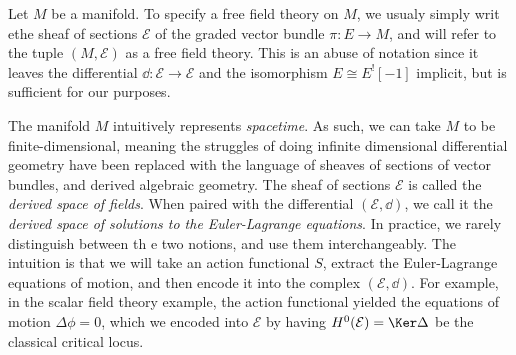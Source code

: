 \begin{terminology}\label{term:4.3.2}
	Let $M$ be a manifold. To specify a free field theory on $M$, we usualy simply writ ethe sheaf of sections $\mathcal{E} $ of the graded vector bundle $\pi : E \to M$, and will refer to the tuple $(M,\mathcal{E} )$ as a free field theory. This is an abuse of notation since it leaves the differential $\dd : \mathcal{E}  \to \mathcal{E} $ and the isomorphism $E\cong E^![-1]$ implicit, but is sufficient for our purposes.

	The manifold $M$ intuitively represents \emph{spacetime}. As such, we can take $M$ to be finite-dimensional, meaning the struggles of doing infinite dimensional differential geometry have been replaced with the language of sheaves of sections of vector bundles, and derived algebraic geometry. The sheaf of sections $\mathcal{E} $ is called the \emph{derived space of fields}. When paired with the differential $(\mathcal{E} ,\dd )$, we call it the \emph{derived space of solutions to the Euler-Lagrange equations}. In practice, we rarely distinguish between th e two notions, and use them interchangeably. The intuition is that we will take an action functional $S$, extract the Euler-Lagrange equations of motion, and then encode it into the complex $(\mathcal{E} ,\dd )$. For example, in the scalar field theory example, the action functional yielded the equations of motion $\Delta \phi =0$, which we encoded into $\mathcal{E} $ by having $H^0(\mathcal{E} ) = \Ker \Delta $ be the classical critical locus.
\end{terminology}



